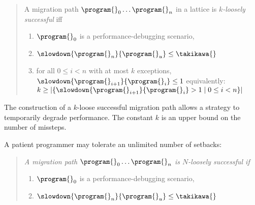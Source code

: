 \begin{quote} \em

A migration path ${\program{}_0} \ldots {\program{}_n}$ in a
lattice  is \emph{$k$-loosely successful}
iff 
\begin{enumerate}
  \item  $\program{}_0$ is a performance-debugging scenario,
  \item $\slowdown{\program{}_n}{\program{}_u} \leq \takikawa{}$  
  \item
      for all $0 \leq i < n$ with at most $k$ exceptions,
      $\slowdown{\program{}_{i+1}}{\program{}_{i}} \leq 1$
      \subitem equivalently: $k \geq |\{ \slowdown{\program{}_{i+1}}{\program{}_{i}} > 1 \mid 0 \leq i < n\}|$
  \end{enumerate} 
\end{quote}
The construction of a $k$-loose successful migration path allows a strategy to
temporarily degrade performance. The constant $k$ is an
upper bound on the number of missteps.

A patient programmer may tolerate an unlimited number of setbacks:

\begin{quote} \em
A migration path ${\program{}_0} \ldots {\program{}_n}$ is $N$-loosely successful if 
  \begin{enumerate}
  \item  $\program{}_0$ is a performance-debugging scenario,
  \item $\slowdown{\program{}_n}{\program{}_u} \leq \takikawa{}$  
  \end{enumerate}
\end{quote}

